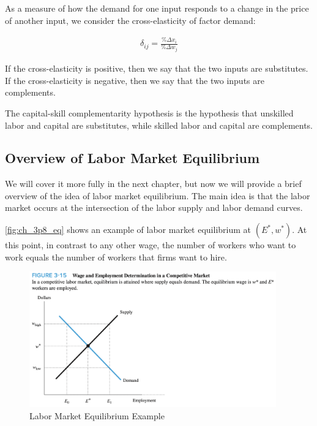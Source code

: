 \begin{definition} 
    
    As a measure of how the demand for one input 
    responds to a change in the price of another input, 
    we consider the cross-elasticity of factor demand:

    \begin{align}
        \delta_{ij} = \frac{ \% \Delta x_i}{\% \Delta w_j}
    \end{align}

\end{definition}

If the cross-elasticity is positive, then we say that 
the two inputs are substitutes.
If the cross-elasticity is negative, then we say that
the two inputs are complements.

\begin{definition}
    
    The capital-skill complementarity hypothesis
    is the hypothesis that unskilled labor 
    and capital are substitutes, while
    skilled labor and capital are complements.
    
\end{definition}

\subsection{Overview of Labor Market Equilibrium}

We will cover it more fully in the next 
chapter, but now we will provide a brief overview of 
the idea of labor market equilibrium.
The main idea is that the labor market
occurs at the intersection of 
the labor supply and labor demand curves.

\autoref{fig:ch_3p8_eq}
shows an example of labor market equilibrium
at $(E^*, w^*)$. At this point, in contrast to 
any other wage, the number of workers 
who want to work equals the number of workers
that firms want to hire.

\FloatBarrier

\begin{figure}[!htb]
    \centering
        \includegraphics[width=0.95\textwidth]{../input/ch_3p8_eq.png}
    \caption{Labor Market Equilibrium Example}
    \label{fig:ch_3p8_eq}
\end{figure}

